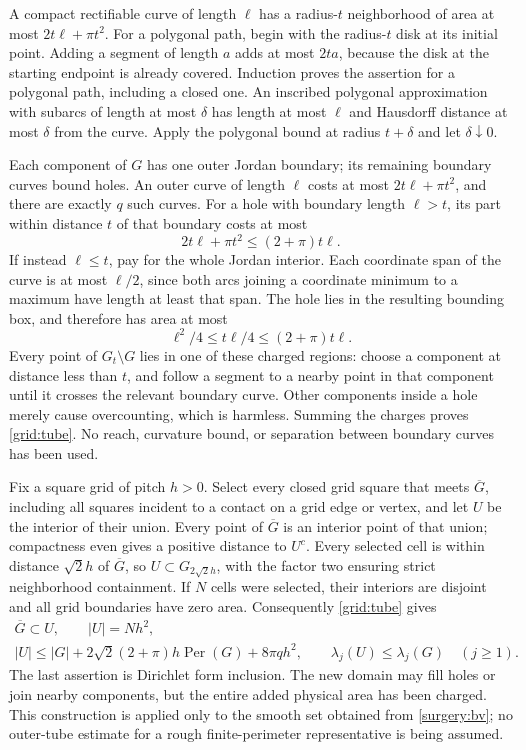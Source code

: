 \documentclass[11pt,reqno]{amsart}
\numberwithin{equation}{section}
\newcommand{\abs}[1]{\lvert#1\rvert}
\begin{document}
A compact rectifiable curve of length \(\ell\) has a radius-\(t\)
neighborhood of area at most \(2t\ell+\pi t^2\).
For a polygonal path, begin with the radius-\(t\) disk at its initial
point.  Adding a segment of length \(a\) adds at most \(2ta\),
because the disk at the starting endpoint is already covered.
Induction proves the assertion for a polygonal path, including a
closed one.  An inscribed polygonal approximation with subarcs of
length at most \(\delta\) has length at most \(\ell\) and Hausdorff
distance at most \(\delta\) from the curve.  Apply the polygonal
bound at radius \(t+\delta\) and let \(\delta\downarrow0\).

Each component of \(G\) has one outer Jordan boundary; its remaining
boundary curves bound holes.  An outer curve of length \(\ell\)
costs at most \(2t\ell+\pi t^2\), and there are exactly \(q\) such
curves.  For a hole with boundary length \(\ell>t\), its part within
distance \(t\) of that boundary costs at most
\[
 2t\ell+\pi t^2\le(2+\pi)t\ell.
\]
If instead \(\ell\le t\), pay for the whole Jordan interior.
Each coordinate span of the curve is at most \(\ell/2\), since
both arcs joining a coordinate minimum to a maximum have length
at least that span.  The hole lies in the resulting bounding box,
and therefore has area at most
\[
 \ell^2/4\le t\ell/4\le(2+\pi)t\ell.
\]
Every point of \(G_t\setminus G\) lies in one of these charged
regions: choose a component at distance less than \(t\), and
follow a segment to a nearby point in that component until it
crosses the relevant boundary curve.  Other components inside a
hole merely cause overcounting, which is harmless.  Summing the
charges proves \eqref{grid:tube}.  No reach, curvature bound, or
separation between boundary curves has been used.

Fix a square grid of pitch \(h>0\).  Select every closed grid
square that meets \(\overline G\), including all squares incident
to a contact on a grid edge or vertex, and let \(U\) be the interior
of their union.  Every point of \(\overline G\) is an interior point
of that union; compactness even gives a positive distance to \(U^c\).
Every selected cell is within distance \(\sqrt2h\) of \(\overline G\),
so \(U\subset G_{2\sqrt2h}\), with the factor two ensuring strict
neighborhood containment.  If \(N\) cells were selected, their
interiors are disjoint and all grid boundaries have zero area.
Consequently \eqref{grid:tube} gives
\begin{equation}
 \begin{gathered}
  \overline G\subset U,\qquad
  \abs U=Nh^2,\\
  \abs U\le\abs G+2\sqrt2(2+\pi)h\operatorname{Per}(G)
                       +8\pi qh^2,\qquad
  \lambda_j(U)\le\lambda_j(G)\quad(j\ge1).
 \end{gathered}
 \label{grid:outer-cover}
\end{equation}
The last assertion is Dirichlet form inclusion.  The new domain may
fill holes or join nearby components, but the entire added physical
area has been charged.  This construction is applied only to the
smooth set obtained from \eqref{surgery:bv}; no outer-tube estimate
for a rough finite-perimeter representative is being assumed.
\end{document}

